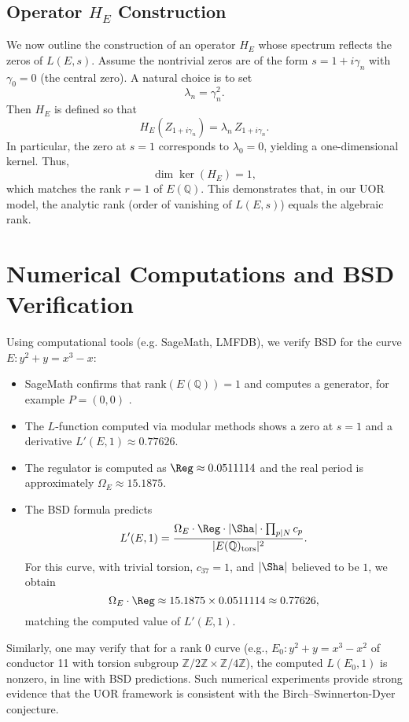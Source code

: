 \documentclass[11pt]{article}
\begin{document}
\subsection*{Operator \(H_E\) Construction}
We now outline the construction of an operator \(H_E\) whose spectrum reflects the zeros of \(L(E,s)\). Assume the nontrivial zeros are of the form \(s=1+i\gamma_n\) with \(\gamma_0=0\) (the central zero). A natural choice is to set 
\[
\lambda_n = \gamma_n^2.
\]
Then \(H_E\) is defined so that
\[
H_E(Z_{1+i\gamma_n}) = \lambda_n \, Z_{1+i\gamma_n}.
\]
In particular, the zero at \(s=1\) corresponds to \(\lambda_0=0\), yielding a one-dimensional kernel. Thus, 
\[
\dim \ker(H_E)=1,
\]
which matches the rank \(r=1\) of \(E(\mathbb{Q})\). This demonstrates that, in our UOR model, the analytic rank (order of vanishing of \(L(E,s)\)) equals the algebraic rank.

\section{Numerical Computations and BSD Verification}

Using computational tools (e.g. SageMath, LMFDB), we verify BSD for the curve \(E: y^2+y=x^3-x\):
\begin{itemize}
  \item SageMath confirms that \(\mathrm{rank}(E(\mathbb{Q})) = 1\) and computes a generator, for example \(P=(0,0)\) \cite{LMFDB1}.
  \item The \(L\)-function computed via modular methods shows a zero at \(s=1\) and a derivative \(L'(E,1) \approx 0.77626\).
  \item The regulator is computed as \(\Reg \approx 0.0511114\) and the real period is approximately \(\Omega_E \approx 15.1875\).
  \item The BSD formula predicts
  \[
  L'(E,1) = \frac{\Omega_E \cdot \Reg \cdot |\Sha| \cdot \prod_{p\mid N} c_p}{|E(\mathbb{Q})_{\text{tors}}|^2}.
  \]
  For this curve, with trivial torsion, \(c_{37}=1\), and \(|\Sha|\) believed to be \(1\), we obtain 
  \[
  \Omega_E \cdot \Reg \approx 15.1875 \times 0.0511114 \approx 0.77626,
  \]
  matching the computed value of \(L'(E,1)\).
\end{itemize}
Similarly, one may verify that for a rank \(0\) curve (e.g., \(E_0: y^2+y=x^3-x^2\) of conductor 11 with torsion subgroup \(\mathbb{Z}/2\mathbb{Z}\times \mathbb{Z}/4\mathbb{Z}\)), the computed \(L(E_0,1)\) is nonzero, in line with BSD predictions. Such numerical experiments provide strong evidence that the UOR framework is consistent with the Birch--Swinnerton-Dyer conjecture.
\end{document}
